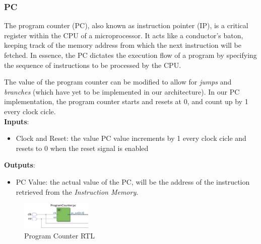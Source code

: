 \documentclass[9pt,a4paper,twoside]{tau}
\begin{document}
\subsubsection{PC}
    The program counter (PC), also known as instruction pointer (IP), is a critical register within the CPU of a microprocessor. It acts like a conductor's baton, keeping track of the memory address from which the next instruction will be fetched. In essence, the PC dictates the execution flow of a program by specifying the sequence of instructions to be processed by the CPU.

    The value of the program counter can be modified to allow for \textit{jumps} and \textit{branches} (which have yet to be implemented in our architecture). In our PC implementation, the program counter starts and resets at 0, and count up by 1 every clock cicle.\\
    
    \textbf{Inputs}:
    \begin{itemize}
        \item Clock and Reset: the value PC value increments by 1 every clock cicle and resets to 0 when the reset signal is enabled 
    \end{itemize}
    \textbf{Outputs}:
    \begin{itemize}
        \item PC Value: the actual value of the PC, will be the address of the instruction retrieved from the \textit{Instruction Memory}.
    \end{itemize}
    
    \begin{figure}[h]  %
        \centering  %
        \includegraphics[width=0.3\textwidth]{images/PCImg.png}
        \caption{Program Counter RTL}
        \label{fig:Counter RTL}
    \end{figure}





\end{document}
